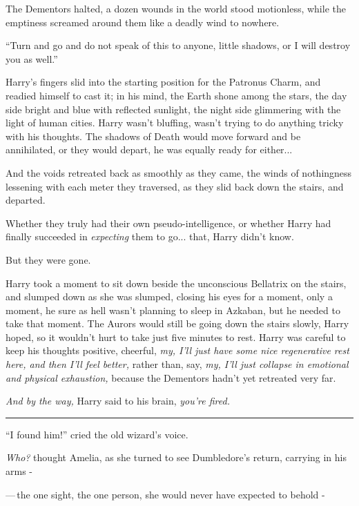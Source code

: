 The Dementors halted, a dozen wounds in the world stood motionless, while the emptiness screamed around them like a deadly wind to nowhere.

``Turn and go and do not speak of this to anyone, little shadows, or I will destroy you as well.''

Harry's fingers slid into the starting position for the Patronus Charm, and readied himself to cast it; in his mind, the Earth shone among the stars, the day side bright and blue with reflected sunlight, the night side glimmering with the light of human cities. Harry wasn't bluffing, wasn't trying to do anything tricky with his thoughts. The shadows of Death would move forward and be annihilated, or they would depart, he was equally ready for either...

And the voids retreated back as smoothly as they came, the winds of nothingness lessening with each meter they traversed, as they slid back down the stairs, and departed.

Whether they truly had their own pseudo-intelligence, or whether Harry had finally succeeded in \emph{expecting} them to go... that, Harry didn't know.

But they were gone.

Harry took a moment to sit down beside the unconscious Bellatrix on the stairs, and slumped down as she was slumped, closing his eyes for a moment, only a moment, he sure as hell wasn't planning to sleep in Azkaban, but he needed to take that moment. The Aurors would still be going down the stairs slowly, Harry hoped, so it wouldn't hurt to take just five minutes to rest. Harry was careful to keep his thoughts positive, cheerful, \emph{my, I'll just have some nice regenerative rest here, and then I'll feel better,} rather than, say, \emph{my, I'll just collapse in emotional and physical exhaustion,} because the Dementors hadn't yet retreated very far.

\emph{And by the way,} Harry said to his brain, \emph{you're fired.}

\begin{center}\rule{3in}{0.4pt}\end{center}

``I found him!'' cried the old wizard's voice.

\emph{Who?} thought Amelia, as she turned to see Dumbledore's return, carrying in his arms -

---\,the one sight, the one person, she would never have expected to behold -

